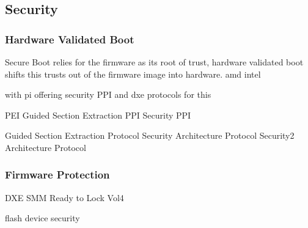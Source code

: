 
\subsection{Security}

\subsubsection{Hardware Validated Boot}
Secure Boot relies for the firmware as its root of trust, hardware validated boot shifts this trusts out of the firmware image into hardware.
amd
intel

with pi offering security PPI and dxe protocols for this

PEI Guided Section Extraction PPI
Security PPI

Guided Section Extraction Protocol
Security Architecture Protocol
Security2 Architecture Protocol


\subsubsection{Firmware Protection}




DXE SMM Ready to Lock Vol4




flash device security







